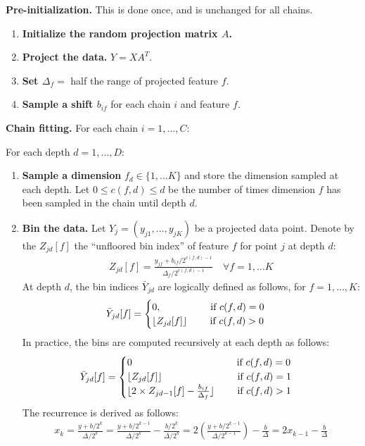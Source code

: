 \documentclass[11pt,onecolumn]{article}
\DeclarePairedDelimiter\floor{\lfloor}{\rfloor}
\begin{document}
\textbf{Pre-initialization.} This is done once, and is unchanged for all chains.
\begin{enumerate}
	\item \textbf{Initialize the random projection matrix $A$.}
	\item \textbf{Project the data.} $Y = XA^T$.
	\item \textbf{Set $\Delta_f =$} half the range of projected feature $f$.
	\item \textbf{Sample a shift $b_{if}$} for each chain $i$ and feature $f$.
\end{enumerate}

\textbf{Chain fitting.} For each chain $i = 1, \dots, C$:

\quad For each depth $d = 1, \dots, D$:
\begin{enumerate}
	\item \textbf{Sample a dimension} $f_d \in \{1, \dots K\}$ and store the dimension sampled at each depth. Let $0 \leq c(f,d) \leq d$ be the number of times dimension $f$ has been sampled in the chain until depth $d$.

	\item \textbf{Bin the data.} Let $Y_j = (y_{j1}, \dots, y_{jK})$ be a projected data point. Denote by the $Z_{jd}[f]$ the ``unfloored bin index'' of feature $f$ for point $j$ at depth $d$:
	\begin{eqnarray}
		Z_{jd}[f] = \frac{y_{jf} + b_{if}/2^{c(f,d)-1}}{\Delta_f/2^{c(f,d)-1}}\quad\forall f = 1, \dots K
	\end{eqnarray}
		At depth $d$, the bin indices $\bar{Y}_{jd}$ are logically defined as follows, for $f = 1, \dots, K$:
	\begin{eqnarray}
		\bar{Y}_{jd}[f] =
		\begin{cases}
			 0,\quad\quad\quad\quad~~~\textrm{if } c(f,d) = 0\\
			 \floor{Z_{jd}[f]}\quad\quad\textrm{ if } c(f,d) > 0
		 \end{cases}
	\end{eqnarray}
	In practice, the bins are computed recursively at each depth as follows:
	\begin{eqnarray}
		\bar{Y}_{jd}[f] =
		\begin{cases}
			0\quad\quad\quad\quad\quad\quad\quad\quad\quad~~~~\textrm{ if } c(f,d) = 0\\
			\floor{Z_{jd}[f]}\quad\quad\quad\quad\quad\quad~~~~\textrm{ if } c(f,d) = 1\\
			\floor{2 \times Z_{jd-1}[f] - \frac{b_{if}}{\Delta_f}}\quad\quad\textrm{ if } c(f,d) > 1
		\end{cases}
	\end{eqnarray}
	The recurrence is derived as follows:
	\begin{eqnarray}
		x_k = \frac{y + b/2^{k}}{\Delta/2^k}
			= \frac{y + b/2^{k-1}}{\Delta/2^{k}} - \frac{b/2^{k}}{\Delta/2^{k}}
				= 2\left(\frac{y + b/2^{k-1}}{\Delta/2^{k-1}}\right) - \frac{b}{\Delta} = 2x_{k-1} - \frac{b}{\Delta}
	\end{eqnarray}


\end{enumerate}
\end{document}
